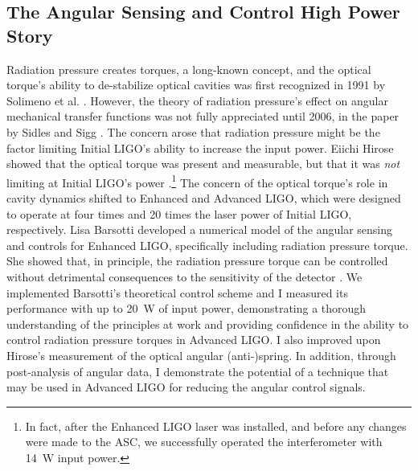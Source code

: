 \subsection{The Angular Sensing and Control High Power Story}
Radiation pressure creates torques, a long-known concept, and the
optical torque's ability to de-stabilize optical cavities was first
recognized in 1991 by Solimeno et
al. \cite{Solimeno1991FabryPerot}. However, the theory of radiation
pressure's effect on angular mechanical transfer functions was not
fully appreciated until 2006, in the paper by Sidles and Sigg
\cite{Sidles2006Optical}. The concern arose that radiation pressure
might be the factor limiting Initial LIGO's ability to increase the
input power. Eiichi Hirose showed that the optical torque was present
and measurable, but that it was \emph{not} limiting at Initial LIGO's
power \cite{Hirose2010Angular}.\footnote{In fact, after the Enhanced
  LIGO laser was installed, and before any changes were made to the
  ASC, we successfully operated the interferometer with 14~W input
  power.} %
The concern of the optical torque's role in cavity dynamics shifted to
Enhanced and Advanced LIGO, which were designed to operate at four
times and 20 times the laser power of Initial LIGO, respectively. Lisa
Barsotti developed a numerical model of the angular sensing and
controls for Enhanced LIGO, specifically including radiation pressure
torque. She showed that, in principle, the radiation pressure torque
can be controlled without detrimental consequences to the sensitivity
of the detector \cite{Barsotti2009Modeling}. We implemented Barsotti's
theoretical control scheme and I measured its performance with up to
20~W of input power, demonstrating a thorough understanding of the
principles at work and providing confidence in the ability to control
radiation pressure torques in Advanced LIGO. I also improved upon
Hirose's measurement of the optical angular (anti-)spring. In
addition, through post-analysis of angular data, I demonstrate the
potential of a technique that may be used in Advanced LIGO for
reducing the angular control signals.



